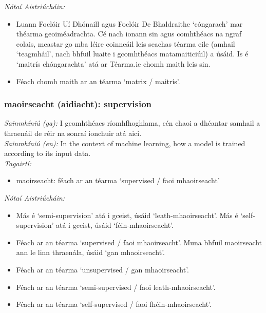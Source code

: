 \noindent \textit{Nótaí Aistriúcháin:}
\begin{itemize}
	\item Luann Foclóir Uí Dhónaill agus Foclóir De Bhaldraithe `cóngarach' mar théarma geoiméadrachta. Cé nach ionann sin agus comhthéacs na ngraf eolais, meastar go mba léire coinneáil leis seachas téarma eile (amhail `teagmháil', nach bhfuil luaite i gcomhthéacs matamaiticiúil) a úsáid. Is é `maitrís chóngarachta' atá ar Téarma.ie chomh maith leis sin.
	\item Féach chomh maith ar an téarma `matrix / maitrís'.
\end{itemize}


\subsubsection*{maoirseacht (aidiacht): supervision}
 \noindent \textit{Sainmhíniú (ga):} I gcomhthéacs ríomhfhoghlama, cén chaoi a dhéantar samhail a thraenáil de réir na sonraí ionchuir atá aici.
\\
 \noindent \textit{Sainmhíniú (en):} In the context of machine learning, how a model is trained according to its input data.
\\
 \noindent \textit{Tagairtí:}
\begin{itemize}
	\item maoirseacht: féach ar an téarma `supervised / faoi mhaoirseacht'
\end{itemize}

 \noindent \textit{Nótaí Aistriúcháin:}
\begin{itemize}
	\item Más é `semi-supervision' atá i gceist, úsáid `leath-mhaoirseacht'. Más é `self-supervision' atá i gceist, úsáid `féin-mhaoirseacht'.
	\item Féach ar an téarma `supervised / faoi mhaoirseacht'. Muna bhfuil maoirseacht ann le linn thraenála, úsáid `gan mhaoirseacht'.
	\item Féach ar an téarma `unsupervised / gan mhaoirseacht'.
	\item Féach ar an téarma `semi-supervised / faoi leath-mhaoirseacht'.
	\item Féach ar an téarma `self-supervised / faoi fhéin-mhaoirseacht'.
\end{itemize}


